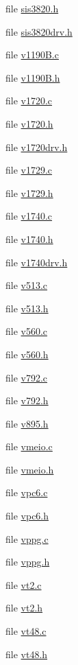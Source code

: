 \begin{DoxyCompactItemize}
file \hyperlink{sis3820_8h}{sis3820.h}
\item 
file \hyperlink{sis3820drv_8h}{sis3820drv.h}
\item 
file \hyperlink{v1190B_8c}{v1190B.c}
\item 
file \hyperlink{v1190B_8h}{v1190B.h}
\item 
file \hyperlink{v1720_8c}{v1720.c}
\item 
file \hyperlink{v1720_8h}{v1720.h}
\item 
file \hyperlink{v1720drv_8h}{v1720drv.h}
\item 
file \hyperlink{v1729_8c}{v1729.c}
\item 
file \hyperlink{v1729_8h}{v1729.h}
\item 
file \hyperlink{v1740_8c}{v1740.c}
\item 
file \hyperlink{v1740_8h}{v1740.h}
\item 
file \hyperlink{v1740drv_8h}{v1740drv.h}
\item 
file \hyperlink{v513_8c}{v513.c}
\item 
file \hyperlink{v513_8h}{v513.h}
\item 
file \hyperlink{v560_8c}{v560.c}
\item 
file \hyperlink{v560_8h}{v560.h}
\item 
file \hyperlink{v792_8c}{v792.c}
\item 
file \hyperlink{v792_8h}{v792.h}
\item 
file \hyperlink{v895_8h}{v895.h}
\item 
file \hyperlink{vmeio_8c}{vmeio.c}
\item 
file \hyperlink{vmeio_8h}{vmeio.h}
\item 
file \hyperlink{vpc6_8c}{vpc6.c}
\item 
file \hyperlink{vpc6_8h}{vpc6.h}
\item 
file \hyperlink{vppg_8c}{vppg.c}
\item 
file \hyperlink{vppg_8h}{vppg.h}
\item 
file \hyperlink{vt2_8c}{vt2.c}
\item 
file \hyperlink{vt2_8h}{vt2.h}
\item 
file \hyperlink{vt48_8c}{vt48.c}
\item 
file \hyperlink{vt48_8h}{vt48.h}
\end{DoxyCompactItemize}

